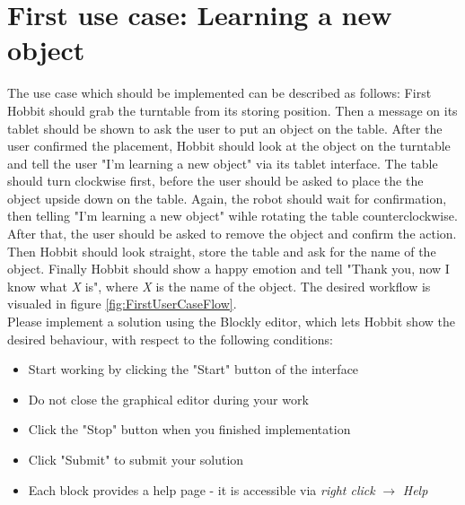 \documentclass[a4paper,12pt]{article}
\begin{document}
\section*{First use case: Learning a new object}
The use case which should be implemented can be described as follows: First Hobbit should grab the turntable from its storing position. Then a message on its tablet should be shown to ask the user to put an object on the table. After the user confirmed the placement, Hobbit should look at the object on the turntable and tell the user "I'm learning a new object" via its tablet interface. The table should turn clockwise first, before the user should be asked to place the the object upside down on the table. Again, the robot should wait for confirmation, then telling "I'm learning a new object" wihle rotating the table counterclockwise. After that, the user should be asked to remove the object and confirm the action. Then Hobbit should look straight, store the table and ask for the name of the object. Finally Hobbit should show a happy emotion and tell "Thank you, now I know what \textit{X} is", where \textit{X} is the name of the object. The desired workflow is visualed in figure \ref{fig:FirstUserCaseFlow}. \\

Please implement a solution using the Blockly editor, which lets Hobbit show the desired behaviour, with respect to the following conditions:
\begin{itemize}
    \item Start working by clicking the "Start" button of the interface
    \item Do not close the graphical editor during your work
    \item Click the "Stop" button when you finished implementation
    \item Click "Submit" to submit your solution
    \item Each block provides a help page - it is accessible via \textit{right click} $\rightarrow$ \textit{Help}
\end{itemize}
\end{document}

